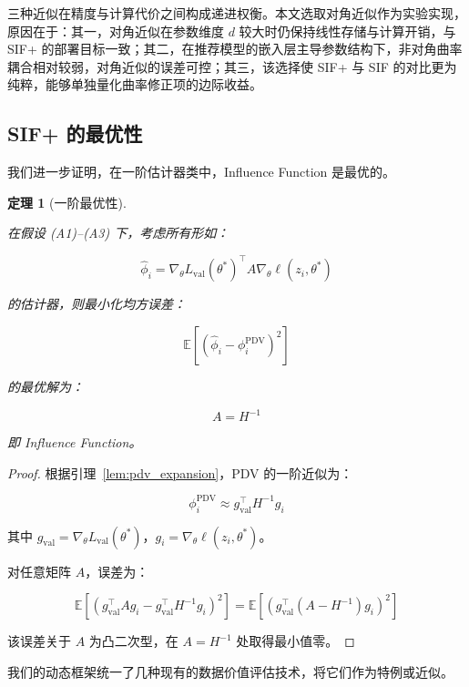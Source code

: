 \documentclass[12pt,a4paper]{ctexart}
\theoremstyle{definition}
\theoremstyle{plain}
\newtheorem{theorem}{定理}[section]
\begin{document}
三种近似在精度与计算代价之间构成递进权衡。本文选取对角近似作为实验实现，原因在于：其一，对角近似在参数维度 $d$ 较大时仍保持线性存储与计算开销，与 SIF+ 的部署目标一致；其二，在推荐模型的嵌入层主导参数结构下，非对角曲率耦合相对较弱，对角近似的误差可控；其三，该选择使 SIF+ 与 SIF 的对比更为纯粹，能够单独量化曲率修正项的边际收益。

\subsection{SIF+ 的最优性}
\label{sec:sif_optimal}

我们进一步证明，在一阶估计器类中，Influence Function 是最优的。

\begin{theorem}[一阶最优性]
\label{thm:sif_optimal}

在假设 (A1)--(A3) 下，考虑所有形如：

\begin{equation}
\hat{\phi}_i = \nabla_\theta L_{\mathrm{val}}(\theta^*)^\top A \nabla_\theta \ell(z_i, \theta^*)
\label{eq:estimator_class}
\end{equation}

的估计器，则最小化均方误差：

\[
\mathbb{E}[(\hat{\phi}_i - \phi_i^{\mathrm{PDV}})^2]
\]

的最优解为：

\begin{equation}
A = H^{-1}
\label{eq:optimal_A}
\end{equation}

即 Influence Function。
\end{theorem}

\begin{proof}
根据引理~\ref{lem:pdv_expansion}，PDV 的一阶近似为：

\[
\phi_i^{\mathrm{PDV}} \approx g_{\mathrm{val}}^\top H^{-1} g_i
\]

其中 \(g_{\mathrm{val}} = \nabla_\theta L_{\mathrm{val}}(\theta^*)\)，\(g_i = \nabla_\theta \ell(z_i, \theta^*)\)。

对任意矩阵 \(A\)，误差为：

\[
\mathbb{E}[(g_{\mathrm{val}}^\top A g_i - g_{\mathrm{val}}^\top H^{-1} g_i)^2] = \mathbb{E}[(g_{\mathrm{val}}^\top (A - H^{-1}) g_i)^2]
\]

该误差关于 \(A\) 为凸二次型，在 \(A = H^{-1}\) 处取得最小值零。
\end{proof}

我们的动态框架统一了几种现有的数据价值评估技术，将它们作为特例或近似。
\end{document}
